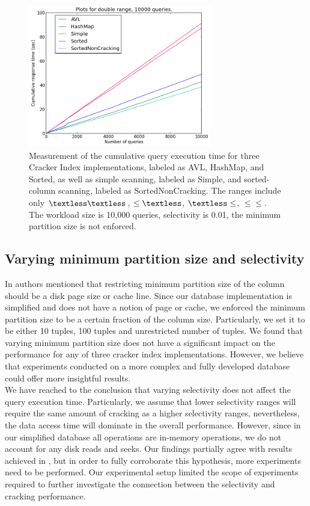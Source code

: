 \begin{figure}[h]
\includegraphics[width=8cm]{figures/double10000}
\caption{Measurement of the cumulative query execution time for three Cracker Index implementations, labeled as AVL, HashMap, and Sorted, as well as simple scanning, labeled as Simple, and sorted-column scanning, labeled as SortedNonCracking. The ranges include only $\textless\textless$, $\leq\textless$, $\textless\leq$, $\leq\leq$. The workload size is 10,000 queries, selectivity is 0.01, the minimum partition size is not enforced.}
\label{fig:double10000}
\end{figure}

\subsection{Varying minimum partition size and selectivity}
In \cite{idreos_2007} authors mentioned that restricting minimum partition size of the column  should be a disk page size or cache line. Since our database implementation is simplified and does not have a notion of page or cache, we enforced the minimum partition size to be a certain fraction of the column size. Particularly, we set it to be either 10 tuples, 100 tuples and unrestricted number of tuples. We found that varying minimum partition size does not have a significant impact on the performance for any of three cracker index implementations. However, we believe that experiments conducted on a more complex and fully developed database could offer more insightful results. \\
We have reached to the conclusion that varying selectivity does not affect the query execution time. Particularly, we assume that lower selectivity ranges will require the same amount of cracking as a higher selectivity ranges, nevertheless, the data access time will dominate in the overall performance. However, since in our simplified database all operations are in-memory operations, we do not account for any disk reads and seeks. Our findings partially agree with results achieved in \cite{schuhknecht_2014}, but in order to fully corroborate this hypothesis, more experiments need to be performed. Our experimental setup limited the scope of experiments required to further investigate the connection between the selectivity and cracking performance.


